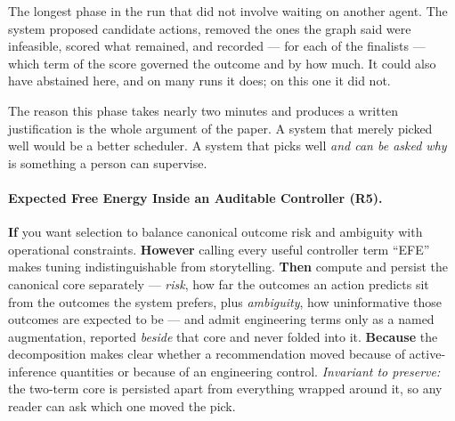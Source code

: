 The longest phase in the run that did not involve waiting on another agent.  The
system proposed candidate actions, removed the ones the graph said were
infeasible, scored what remained, and recorded --- for each of the finalists ---
which term of the score governed the outcome and by how much.  It could also
have abstained here, and on many runs it does; on this one it did not.

The reason this phase takes nearly two minutes and produces a written
justification is the whole argument of the paper.  A system that merely picked
well would be a better scheduler.  A system that picks well \emph{and can be
asked why} is something a person can supervise.

\hypertarget{pat-r5}{}\paragraph{Expected Free Energy Inside an Auditable Controller (R5).}\label{pat:r5} \textbf{If} you want selection to balance canonical outcome risk and ambiguity with operational constraints. \textbf{However} calling every useful controller term ``EFE'' makes tuning indistinguishable from storytelling. \textbf{Then} compute and persist the canonical core separately --- \emph{risk}, how far the outcomes an action predicts sit from the outcomes the system prefers, plus \emph{ambiguity}, how uninformative those outcomes are expected to be --- and admit engineering terms only as a named augmentation, reported \emph{beside} that core and never folded into it. \textbf{Because} the decomposition makes clear whether a recommendation moved because of active-inference quantities or because of an engineering control.  \emph{Invariant to preserve:} the two-term core is persisted apart from everything wrapped around it, so any reader can ask which one moved the pick.
